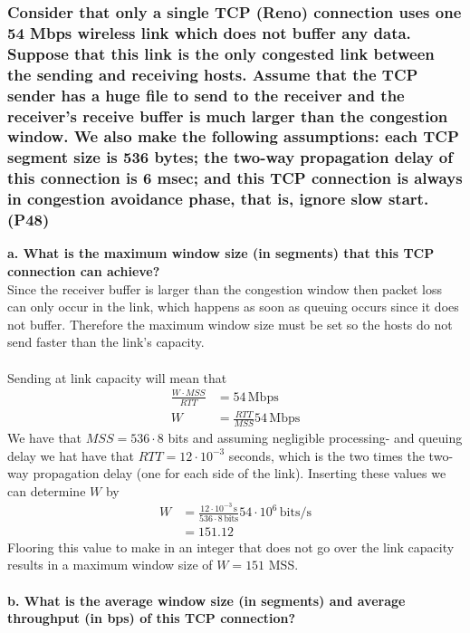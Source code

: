 \subsubsection{Consider that only a single TCP (Reno) connection uses one 54 Mbps wireless link which does not buffer any data. Suppose that this link is the only congested link between the sending and receiving hosts. Assume that the TCP sender has a huge file to send to the receiver and the receiver's receive buffer is much larger than the congestion window. We also make the following assumptions: each TCP segment size is 536 bytes; the two-way propagation delay of this connection is 6 msec; and this TCP connection is always in congestion avoidance phase, that is, ignore slow start. (P48)}

\textbf{a. What is the maximum window size (in segments) that this TCP connection can achieve?} \\
Since the receiver buffer is larger than the congestion window then packet loss can only occur in the link, which happens as soon as queuing occurs since it does not buffer. Therefore the maximum window size must be set so the hosts do not send faster than the link's capacity. \\
\\
Sending at link capacity will mean that 
\begin{equation*}
\begin{split}
    \frac{W \cdot MSS}{RTT} &= 54 \, \text{Mbps} \\
    W &= \frac{RTT}{MSS} 54 \, \text{Mbps}
\end{split}
\end{equation*}
We have that $MSS = 536 \cdot 8$ bits and assuming negligible processing- and queuing delay we hat have that $RTT = 12 \cdot 10^{-3}$ seconds, which is the two times the two-way propagation delay (one for each side of the link). Inserting these values we can determine $W$ by
\begin{equation*}
\begin{split}
    W &= \frac{12 \cdot 10^{-3} \, \text{s}}{536 \cdot 8 \, \text{bits}} 54 \cdot 10^6 \, \text{bits/s} \\
    &= 151.12
\end{split}
\end{equation*}
Flooring this value to make in an integer that does not go over the link capacity results in a maximum window size of $W = 151$ MSS. \\
\\
\textbf{b. What is the average window size (in segments) and average throughput (in bps) of this TCP connection?} \\
